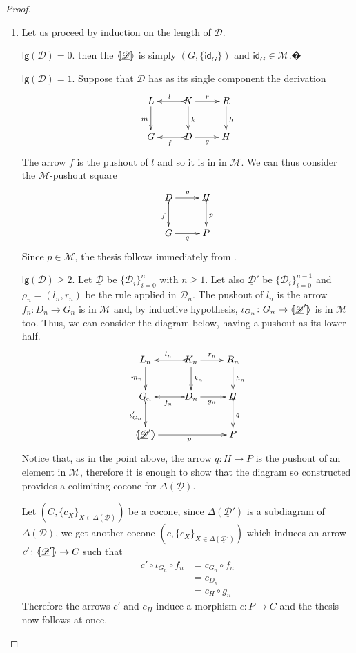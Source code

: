 \documentclass[a4paper]{article}
\newcommand{\id}[1]{\mathsf{id}_{#1}}
\newcommand{\dder}[1]{\mathscr{#1}}
\newcommand{\der}[1]{\underline{\dder{#1}}}
\newcommand{\lpro}{\langle \hspace{-1.85pt}[}
\newcommand{\rpro}{]\hspace{-1.85pt}\rangle}
\newcommand{\tpro}[1]{\lpro \der{#1}\rpro}
\newcommand{\lgh}[0]{\mathsf{lg}}
\theoremstyle{definition}
\begin{document}
\begin{proof}\begin{enumerate}
		\item Let us proceed by induction on the length of $\der{D}$.

	
	\smallskip \noindent $\lgh(\dder{D})=0$. then the $\tpro{\dder{D}}$ is simply $(G, \{\id{G}\})$ and $\id{G}\in \mathcal{M}$.�
	
	\smallskip \noindent$\lgh(\dder{D})=1$. Suppose that $\dder{D}$ has as its single component the derivation
			\[\xymatrix{L \ar[d]_{m}& K \ar[d]^{k}\ar@{>->}[l]_{l} \ar[r]^{r} & R \ar[d]^{h} \\G& \ar@{>->}[l]^{f} D \ar[r]_{g}& H  \\}\]
			The arrow $f$ is  the pushout of $l$ and so it is in in $\mathcal{M}$. We can thus consider the $\mathcal{M}$-pushout square
			\[\xymatrix{D \ar@{>->}[d]_{f} \ar[r]^{g} & H \ar@{>->}[d]^{p} \\G \ar[r]_{q}& P }\]
			Since $p\in \mathcal{M}$, the thesis follows immediately from . 
	
	\smallskip \noindent$\lgh(\dder{D})\geq 2$. Let $\der{D}$ be $\{\dder{D}_i\}_{i=0}^n$ with $n\geq 1$. Let also $\der{D}'$ be $\{\dder{D}_i\}^{n-1}_{i=0}$ and $\rho_n=(l_n, r_n)$ be the rule applied in $\dder{D}_n$. The pushout of $l_n$ is the arrow $f_n\colon D_n\to G_n$ is in $\mathcal{M}$ and, by inductive hypothesis, $\iota_{G_{n}}\colon G_{n}\to \lpro \der{D}'\rpro$ is in $\mathcal{M}$ too. Thus, we can consider the diagram below, having a pushout as its lower half.
			\[\xymatrix{L_n \ar[d]_{m_{n}}& K_{n} \ar[d]^{k_{n}}\ar@{>->}[l]_{l_{n}} \ar[r]^{r_{n}} & R_{n} \ar[d]^{h_n} \\G_{n} \ar@{>->}[d]_{\iota'_{G_{n}}}& \ar@{>->}[l]^{f_n} D_n \ar[r]_{g_n}& H  \ar@{>->}[d]^{q}\\ \lpro \der{D}' \ar[rr]_{p}\rpro && P}\] 
			Notice that, as in the point above, the arrow $q\colon H\to P$ is the pushout of an element in $\mathcal{M}$, therefore it is enough to show that the diagram so constructed provides a colimiting cocone for $\Delta(\der{D})$.
			
			Let $(C, \{c_X\}_{X\in \Delta(\der{D})})$ be a cocone, since $\Delta(\der{D}')$ is a subdiagram of $\Delta(\der{D})$, we get another cocone $(c, \{c_X\}_{X\in \Delta(\der{D}')})$ which induces an arrow $c'\colon \lpro \der{D}' \rpro \to C$ such that
			\begin{align*}
				c'\circ \iota_{G_n} \circ f_n &=c_{G_n} \circ f_n\\&= c_{D_n}\\&= c_{H}\circ g_n
			\end{align*}
			Therefore the arrows $c'$ and $c_H$ induce a morphism $c\colon P\to C$ and the thesis now follows at once.
		

\end{enumerate}
\end{proof}
\end{document}
